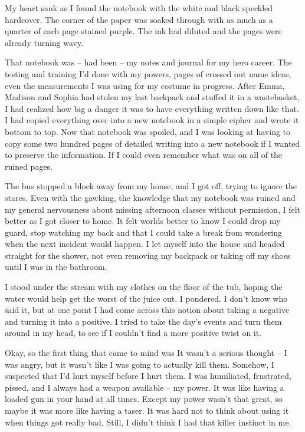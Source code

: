 My heart sank as I found the notebook with the white and black speckled hardcover. The corner of the paper was soaked through with as much as a quarter of each page stained purple. The ink had diluted and the pages were already turning wavy.

That notebook was -- had been -- my notes and journal for my hero career. The testing and training I'd done with my powers, pages of crossed out name ideas, even the measurements I was using for my costume in progress. After Emma, Madison and Sophia had stolen my last backpack and stuffed it in a wastebasket, I had realized how big a danger it was to have everything written down like that. I had copied everything over into a new notebook in a simple cipher and wrote it bottom to top. Now that notebook was spoiled, and I was looking at having to copy some two hundred pages of detailed writing into a new notebook if I wanted to preserve the information. If I could even remember what was on all of the ruined pages.

The bus stopped a block away from my house, and I got off, trying to ignore the stares. Even with the gawking, the knowledge that my notebook was ruined and my general nervousness about missing afternoon classes without permission, I felt better as I got closer to home. It felt worlds better to know I could drop my guard, stop watching my back and that I could take a break from wondering when the next incident would happen. I let myself into the house and headed straight for the shower, not even removing my backpack or taking off my shoes until I was in the bathroom.

I stood under the stream with my clothes on the floor of the tub, hoping the water would help get the worst of the juice out. I pondered. I don't know who said it, but at one point I had come across this notion about taking a negative and turning it into a positive. I tried to take the day's events and turn them around in my head, to see if I couldn't find a more positive twist on it.

Okay, so the first thing that came to mind was  It wasn't a serious thought -- I was angry, but it wasn't like I was going to actually kill them. Somehow, I suspected that I'd hurt myself before I hurt them. I was humiliated, frustrated, pissed, and I always had a weapon available -- my power. It was like having a loaded gun in your hand at all times. Except my power wasn't that great, so maybe it was more like having a taser. It was hard not to think about using it when things got really bad. Still, I didn't think I had that killer instinct in me.

